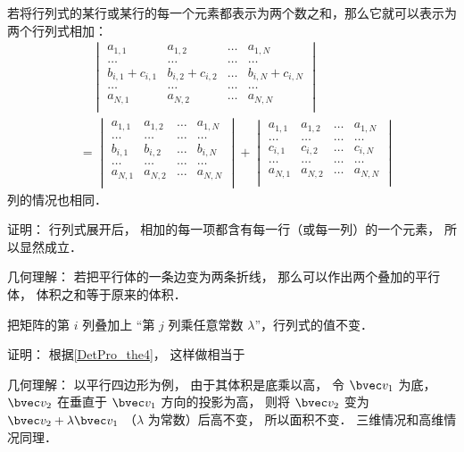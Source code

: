 \begin{theorem}{}\label{DetPro_the4}
若将行列式的某行或某行的每一个元素都表示为两个数之和，那么它就可以表示为两个行列式相加：
\begin{equation}
\begin{aligned}
&\quad\begin{vmatrix}
a_{1,1} & a_{1,2} & \dots & a_{1,N}\\
\dots & \dots & \dots & \dots\\
b_{i,1} + c_{i,1} & b_{i, 2} + c_{i, 2} & \dots & b_{i,N} + c_{i,N}\\
\dots & \dots & \dots & \dots\\
a_{N,1} & a_{N,2} & \dots & a_{N,N}\\
\end{vmatrix}\\
&=
\begin{vmatrix}
a_{1,1} & a_{1,2} & \dots & a_{1,N}\\
\dots & \dots & \dots & \dots\\
b_{i,1} & b_{i, 2} & \dots & b_{i,N}\\
\dots & \dots & \dots & \dots\\
a_{N,1} & a_{N,2} & \dots & a_{N,N}\\
\end{vmatrix}
+
\begin{vmatrix}
a_{1,1} & a_{1,2} & \dots & a_{1,N}\\
\dots & \dots & \dots & \dots\\
c_{i,1} & c_{i, 2} & \dots & c_{i,N}\\
\dots & \dots & \dots & \dots\\
a_{N,1} & a_{N,2} & \dots & a_{N,N}\\
\end{vmatrix}
\end{aligned}
\end{equation}
列的情况也相同．
\end{theorem}
证明： 行列式展开后， 相加的每一项都含有每一行（或每一列）的一个元素， 所以显然成立．

几何理解： 若把平行体的一条边变为两条折线， 那么可以作出两个叠加的平行体， 体积之和等于原来的体积．

\begin{theorem}{ }
把矩阵的第 $i$ 列叠加上 “第 $j$ 列乘任意常数 $\lambda$”，行列式的值不变．
\end{theorem}
证明： 根据\autoref{DetPro_the4}， 这样做相当于

几何理解： 以平行四边形为例， 由于其体积是底乘以高， 令 $\bvec v_1$ 为底， $\bvec v_2$ 在垂直于 $\bvec v_1$ 方向的投影为高， 则将 $\bvec v_2$ 变为 $\bvec v_2 + \lambda \bvec v_1$ （$\lambda$ 为常数）后高不变， 所以面积不变． 三维情况和高维情况同理．

